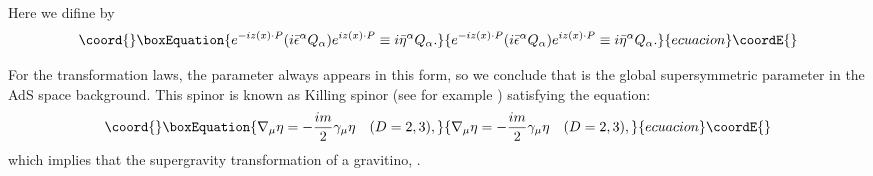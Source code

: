 \documentclass[a4paper,12pt]{article}
\def\baeta{\bar{\eta}}
\def\bepsilon{\bar{\epsilon}}
\begin{document}
Here we difine \myHighlight{$\eta_{\alpha}$}\coordHE{} by
\begin{equation}\coord{}\boxEquation{
e^{-iz(x)\cdot P}(i\bepsilon^{\alpha} Q_{\alpha})e^{iz(x)\cdot P}
	 \equiv i\baeta^{\alpha} Q_{\alpha}.
}{
e^{-iz(x)\cdot P}(i\bepsilon^{\alpha} Q_{\alpha})e^{iz(x)\cdot P}
	 \equiv i\baeta^{\alpha} Q_{\alpha}.
}{ecuacion}\coordE{}\end{equation}


For the transformation laws, the parameter \myHighlight{$\epsilon$}\coordHE{} always appears 
in this form, so we conclude that \myHighlight{$\epsilon=\eta$}\coordHE{} is the global
supersymmetric parameter in the AdS space background. 
This spinor 
is known as Killing spinor (see for example \cite{BF}) satisfying the
equation: 
\begin{equation}\coord{}\boxEquation{
 \nabla_{\mu}\eta = -\frac{im}{2}\gamma_{\mu}\eta \quad (D=2, 3),
  \label{killingeq}
}{
 \nabla_{\mu}\eta = -\frac{im}{2}\gamma_{\mu}\eta \quad (D=2, 3),
  }{ecuacion}\coordE{}\end{equation}
which implies that the supergravity transformation of a gravitino, 
\coordHE{}.
\end{document}
